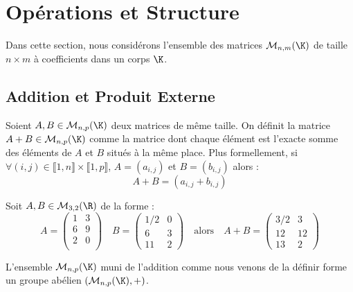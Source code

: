\section{Opérations et Structure}

Dans cette section, nous considérons l'ensemble des matrices $ \mathcal{M}_{n,m}(\K)$ de taille $ n \times m $
à coefficients dans un corps $\K$. 

\subsection{Addition et Produit Externe}

\begin{definition}
    Soient $A,B \in \mathcal{M}_{n,p}(\K)$ deux matrices de même taille. 
    On définit la matrice $A + B \in \mathcal{M}_{n,p}(\K)$ comme la matrice dont chaque élément est 
    l'exacte somme des éléments de $A$ et $B$ situés à la même place. 
    Plus formellement, si $ \forall (i,j) \in \llbracket 1, n \rrbracket \times  \llbracket 1, p \rrbracket$, 
    $ A = (a_{i,j})$ et $ B = (b_{i,j})$ alors : 
        \[ A + B = (a_{i,j} + b_{i,j}) \]
\end{definition}

\begin{example}
    Soit $A,B \in \mathcal{M}_{3,2}(\R)$ de la forme : 
        \[ A = 
            \begin{pmatrix}
                1 & 3 \\ 
                6 & 9 \\ 
                2 & 0 \\ 
            \end{pmatrix}
            \quad B = 
            \begin{pmatrix}
                1/2 & 0 \\ 
                6 & 3 \\ 
                11 & 2
            \end{pmatrix}
            \quad \text{alors} \quad A + B = 
            \begin{pmatrix}
                3/2 & 3 \\ 
                12 & 12 \\ 
                13 & 2 
            \end{pmatrix} \] 
\end{example}

L'ensemble $ \mathcal{M}_{n,p}(\K)$ muni de l'addition comme nous venons de la définir forme un groupe abélien 
$(\mathcal{M}_{n,p}(\K), +)$. 

